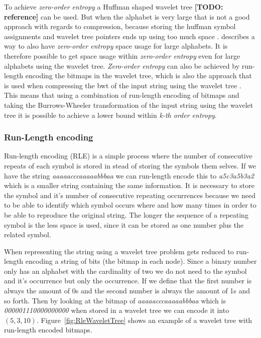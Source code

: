 To achieve \textit{zero-order entropy} a Huffman shaped wavelet tree \textbf{[TODO: reference]} can be used. But when the alphabet is very large that is not a good approach with regards to compression, because storing the huffman symbol assignments and wavelet tree pointers ends up using too much space . \citep[Section~3]{Claude08practicalrankselect} describes a way to also have \textit{zero-order entropy} space usage for large alphabets. 
It is therefore possible to get space usage within \textit{zero-order entropy} even for large alphabets using the wavelet tree. 
\textit{Zero-order entropy} can also be achieved by run-length encoding the bitmaps in the wavelet tree, which is also the approach that is used when compressing the bwt of the input string using the wavelet tree \citep[Introduction (\textbf{B})]{waveletTreeEntropy}.
This means that using a combination of run-length encoding of bitmaps and taking the Burrows-Wheeler transformation of the input string using the wavelet tree it is possible to achieve a lower bound within \textit{k-th order entropy}.

\subsubsection{Run-Length encoding}
Run-length encoding (RLE) is a simple process where the number of consecutive repeats of each symbol is stored in stead of storing the symbols them selves. 
If we have the string \textit{aaaaacccaaaaabbbaa} we can run-length encode this to \textit{a5c3a5b3a2} which is a smaller string containing the same information.
It is necessary to store the symbol and it's number of consecutive repeating occurrences because we need to be able to identify which symbol occurs where and how many times in order to be able to reproduce the original string.
The longer the sequence of a repeating symbol is the less space is used, since it can be stored as one number plus the related symbol.

When representing the string using a wavelet tree problem gets reduced to run-length encoding a string of bits (the bitmap in each node).
Since a binary number only has an alphabet with the cardinality of two we do not need to the symbol and it's occurrence but only the occurrence.
If we define that the first number is always the amount of 0s and the second number is always the amount of 1s and so forth. 
Then by looking at the bitmap of \textit{aaaaacccaaaaabbbaa} which is \textit{000001110000000000} when stored in a wavelet tree we can encode it into $(5,3,10)$.
Figure~\ref{fig:RleWaveletTree} shows an example of a wavelet tree with run-length encoded bitmaps.


